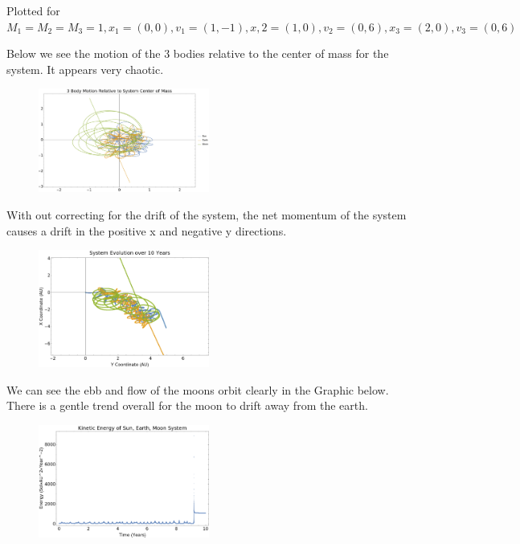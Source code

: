 \documentclass{article}
\begin{document}
Plotted for $M_1 = M_2 = M_3 = 1, x_1=(0,0), v_1 = (1,-1), x,2 = (1,0), v_2 = (0,6), x_3=(2,0), v_3=(0,6)$ 

Below we see the motion of the 3 bodies relative to the center of mass for the system. It appears very chaotic.

\begin{figure}[!htb]
	\begin{center}
		\includegraphics[width=0.5\textwidth]{p2-1a.pdf}
	\end{center}
	\caption{}
\label{fig:qual}
\end{figure}
\FloatBarrier

With out correcting for the drift of the system, the net momentum of the system causes a drift in the positive x and negative y directions.

\begin{figure}[!htb]
	\begin{center}
		\includegraphics[width=0.5\textwidth]{p2-1b.pdf}
	\end{center}
	\caption{}
\label{fig:qual}
\end{figure}
\FloatBarrier

We can see the ebb and flow of the moons orbit clearly in the Graphic below. There is a gentle trend overall for the moon to drift away from the earth.

\begin{figure}[!htb]
	\begin{center}
		\includegraphics[width=0.5\textwidth]{p2-1c.pdf}
	\end{center}
	\caption{}
\label{fig:qual}
\end{figure}
\FloatBarrier
\end{document}
